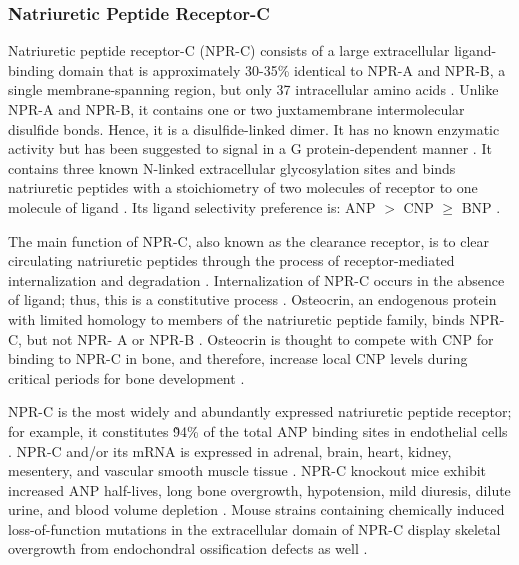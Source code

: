 \documentclass[14pt,a4paper,onecolumn]{extarticle}
\begin{document}
\subsubsection{Natriuretic Peptide Receptor-C}
Natriuretic peptide receptor-C (NPR-C) consists of a large extracellular ligand-binding domain that is approximately 30-35\% identical to NPR-A and NPR-B, a single membrane-spanning region, but only 37 intracellular amino acids \citep{Chang1989} \citep{Fuller1988} \citep{Porter1990}. Unlike NPR-A and NPR-B, it contains one or two juxtamembrane intermolecular disulfide bonds. Hence, it is a disulfide-linked dimer. It has no known enzymatic activity but has been  suggested to signal in a G protein-dependent manner \citep{Rose2008}.
It contains three known N-linked extracellular glycosylation sites \citep{Stults1994} and binds natriuretic peptides with a stoichiometry of two molecules of receptor to one molecule of ligand \citep{Ammarguellat2001}. Its ligand selectivity preference is: ANP $>$ CNP $\ge$ BNP \citep{Bennett1991} \citep{Suga1992a}.

The main function of NPR-C, also known as the clearance receptor, is to clear circulating natriuretic peptides through the process of receptor-mediated internalization and degradation \citep{Koh1992} \citep{Nussenzveig1990}. Internalization of NPR-C occurs in the absence of ligand; thus, this is a constitutive process \citep{Nussenzveig1990}. Osteocrin, an endogenous protein with limited homology to members of the natriuretic peptide family, binds NPR-C, but not NPR- A or NPR-B \citep{Moffatt2007}. Osteocrin is thought to compete with CNP for binding to NPR-C in bone, and therefore, increase local CNP levels during critical periods for bone development \citep{Moffatt2007}.

NPR-C is the most widely and abundantly expressed natriuretic peptide receptor; for example, it constitutes \~94\% of the total ANP binding sites in endothelial cells \citep{Leitman1986}. NPR-C and/or its mRNA is expressed in adrenal, brain, heart, kidney, mesentery, and vascular smooth muscle tissue \citep{Nagase1997} \citep{Porter1990} \citep{Suga1992c} \citep{Wilcox1991}.
NPR-C knockout mice exhibit increased ANP half-lives, long bone overgrowth, hypotension, mild diuresis, dilute urine, and blood volume depletion  \citep{Matsukawa1999}. Mouse strains containing chemically induced loss-of-function mutations in the extracellular domain of NPR-C display skeletal overgrowth from endochondral ossification defects as well \citep{Jaubert1999}.
\end{document}

